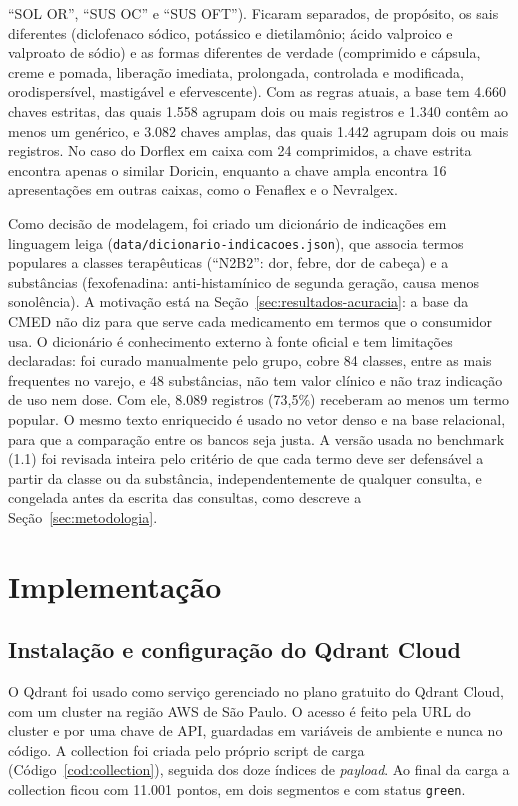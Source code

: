 \documentclass[12pt,oneside,a4paper,english,brazil]{abntex2}
\newcommand{\campo}[1]{\texttt{#1}}
\begin{document}
``SOL OR'', ``SUS OC'' e ``SUS OFT''). Ficaram separados, de propósito, os sais diferentes (diclofenaco sódico, potássico e dietilamônio; ácido valproico e valproato de sódio) e as formas diferentes de verdade (comprimido e cápsula, creme e pomada, liberação imediata, prolongada, controlada e modificada, orodispersível, mastigável e efervescente). Com as regras atuais, a base tem 4.660 chaves estritas, das quais 1.558 agrupam dois ou mais registros e 1.340 contêm ao menos um genérico, e 3.082 chaves amplas, das quais 1.442 agrupam dois ou mais registros. No caso do Dorflex em caixa com 24 comprimidos, a chave estrita encontra apenas o similar Doricin, enquanto a chave ampla encontra 16 apresentações em outras caixas, como o Fenaflex e o Nevralgex.

Como decisão de modelagem, foi criado um dicionário de indicações em linguagem leiga (\campo{data/dicionario-indicacoes.json}), que associa termos populares a classes terapêuticas (``N2B2'': dor, febre, dor de cabeça) e a substâncias (fexofenadina: anti-histamínico de segunda geração, causa menos sonolência). A motivação está na Seção~\ref{sec:resultados-acuracia}: a base da CMED não diz para que serve cada medicamento em termos que o consumidor usa. O dicionário é conhecimento externo à fonte oficial e tem limitações declaradas: foi curado manualmente pelo grupo, cobre 84 classes, entre as mais frequentes no varejo, e 48 substâncias, não tem valor clínico e não traz indicação de uso nem dose. Com ele, 8.089 registros (73,5\%) receberam ao menos um termo popular. O mesmo texto enriquecido é usado no vetor denso e na base relacional, para que a comparação entre os bancos seja justa. A versão usada no benchmark (1.1) foi revisada inteira pelo critério de que cada termo deve ser defensável a partir da classe ou da substância, independentemente de qualquer consulta, e congelada antes da escrita das consultas, como descreve a Seção~\ref{sec:metodologia}.

\chapter{Implementação}

\section{Instalação e configuração do Qdrant Cloud}

O Qdrant foi usado como serviço gerenciado no plano gratuito do Qdrant Cloud, com um cluster na região AWS de São Paulo. O acesso é feito pela URL do cluster e por uma chave de API, guardadas em variáveis de ambiente e nunca no código. A collection foi criada pelo próprio script de carga (Código~\ref{cod:collection}), seguida dos doze índices de \emph{payload}. Ao final da carga a collection ficou com 11.001 pontos, em dois segmentos e com status \campo{green}.
\end{document}
